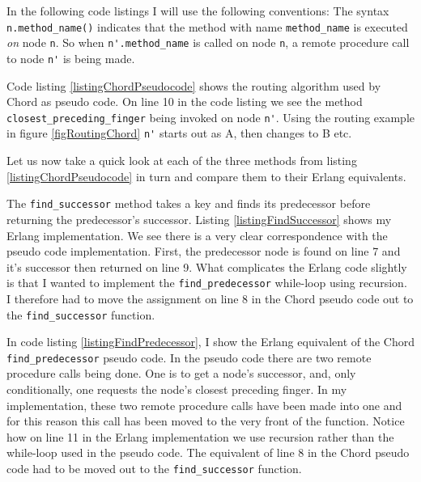 In the following code listings I will use the following conventions:
The syntax \verb=n.method_name()= indicates that the method with name \verb=method_name= is executed \emph{on} node \verb=n=. So when \verb=n'.method_name= is called on node \verb=n=, a remote procedure call to node \verb=n'= is being made.

Code listing \ref{listingChordPseudocode} shows the routing algorithm used by Chord as pseudo code. On line 10 in the code listing we see the method \verb=closest_preceding_finger= being invoked on node \verb=n'=. Using the routing example in figure \ref{figRoutingChord} \verb=n'= starts out as A, then changes to B etc.



Let us now take a quick look at each of the three methods from listing \ref{listingChordPseudocode} in turn and compare them to their Erlang equivalents.

The \verb=find_successor= method takes a key and finds its predecessor before returning the predecessor's successor.
Listing \ref{listingFindSuccessor} shows my Erlang implementation.
We see there is a very clear correspondence with the pseudo code implementation. First, the predecessor node is found on line 7 and it's successor then returned on line 9.
What complicates the Erlang code slightly is that I wanted to implement the \verb=find_predecessor= while-loop using recursion. I therefore had to move the assignment on line 8 in the Chord pseudo code out to the \verb=find_successor= function.



In code listing \ref{listingFindPredecessor}, I show the Erlang equivalent of the Chord \verb=find_predecessor= pseudo code. 
In the pseudo code there are two remote procedure calls being done. One is to get a node's successor, and, only conditionally, one requests the node's closest preceding finger.
In my implementation, these two remote procedure calls have been made into one and for this reason this call has been moved to the very front of the function.
Notice how on line 11 in the Erlang implementation we use recursion rather than the while-loop used in the pseudo code. The equivalent of line 8 in the Chord pseudo code had to be moved out to the \verb=find_successor= function.



